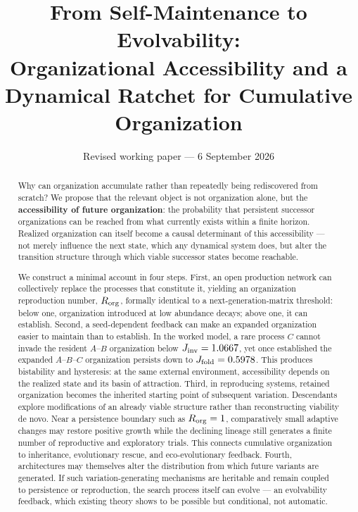 \documentclass[11pt]{article}
\title{\textbf{From Self-Maintenance to Evolvability:\\Organizational Accessibility and a Dynamical Ratchet for Cumulative Organization}}
\author{}
\date{Revised working paper --- 6 September 2026}
\begin{document}
\maketitle

\begin{abstract}
Why can organization accumulate rather than repeatedly being
rediscovered from scratch? We propose that the relevant object is not
organization alone, but the \textbf{accessibility of future
organization}: the probability that persistent successor organizations
can be reached from what currently exists within a finite horizon.
Realized organization can itself become a causal determinant of this
accessibility --- not merely influence the next state, which any
dynamical system does, but alter the transition structure through which
viable successor states become reachable.

We construct a minimal account in four steps. First, an open production
network can collectively replace the processes that constitute it,
yielding an organization reproduction number, \(R_{\rm org}\), formally
identical to a next-generation-matrix threshold: below one, organization
introduced at low abundance decays; above one, it can establish. Second,
a seed-dependent feedback can make an expanded organization easier to
maintain than to establish. In the worked model, a rare process \(C\)
cannot invade the resident \(A\)--\(B\) organization below
\(J_{\rm inv}=1.0667\), yet once established the expanded
\(A\)--\(B\)--\(C\) organization persists down to
\(J_{\rm fold}=0.5978\). This produces bistability and hysteresis: at
the same external environment, accessibility depends on the realized
state and its basin of attraction. Third, in reproducing systems,
retained organization becomes the inherited starting point of subsequent
variation. Descendants explore modifications of an already viable
structure rather than reconstructing viability de novo. Near a
persistence boundary such as \(R_{\rm org}=1\), comparatively small
adaptive changes may restore positive growth while the declining lineage
still generates a finite number of reproductive and exploratory trials.
This connects cumulative organization to inheritance, evolutionary
rescue, and eco-evolutionary feedback. Fourth, architectures may
themselves alter the distribution from which future variants are
generated. If such variation-generating mechanisms are heritable and
remain coupled to persistence or reproduction, the search process itself
can evolve --- an evolvability feedback, which existing theory shows to
be possible but conditional, not automatic.


\end{abstract}
\end{document}

